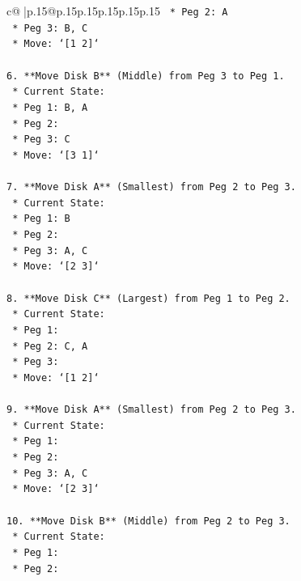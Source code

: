 \documentclass{article}
\begin{document}
{\begin{supertabular}{c@{$\;$}|p{.15\linewidth}@{}p{.15\linewidth}p{.15\linewidth}p{.15\linewidth}p{.15\linewidth}p{.15\linewidth}}
{{{\texttt{        *   Peg 2: A} \\
\texttt{        *   Peg 3: B, C} \\
\texttt{    *   Move: `{[}1 2{]}`} \\
\\ 
\texttt{6.  **Move Disk B** (Middle) from Peg 3 to Peg 1.} \\
\texttt{    *   Current State:} \\
\texttt{        *   Peg 1: B, A} \\
\texttt{        *   Peg 2:} \\
\texttt{        *   Peg 3: C} \\
\texttt{    *   Move: `{[}3 1{]}`} \\
\\ 
\texttt{7.  **Move Disk A** (Smallest) from Peg 2 to Peg 3.} \\
\texttt{    *   Current State:} \\
\texttt{        *   Peg 1: B} \\
\texttt{        *   Peg 2:} \\
\texttt{        *   Peg 3: A, C} \\
\texttt{    *   Move: `{[}2 3{]}`} \\
\\ 
\texttt{8.  **Move Disk C** (Largest) from Peg 1 to Peg 2.} \\
\texttt{    *   Current State:} \\
\texttt{        *   Peg 1:} \\
\texttt{        *   Peg 2: C, A} \\
\texttt{        *   Peg 3:} \\
\texttt{    *   Move: `{[}1 2{]}`} \\
\\ 
\texttt{9.  **Move Disk A** (Smallest) from Peg 2 to Peg 3.} \\
\texttt{    *   Current State:} \\
\texttt{        *   Peg 1:} \\
\texttt{        *   Peg 2:} \\
\texttt{        *   Peg 3: A, C} \\
\texttt{    *   Move: `{[}2 3{]}`} \\
\\ 
\texttt{10. **Move Disk B** (Middle) from Peg 2 to Peg 3.} \\
\texttt{    *   Current State:} \\
\texttt{        *   Peg 1:} \\
\texttt{        *   Peg 2:} \\
}}}
\end{supertabular}}
\end{document}
